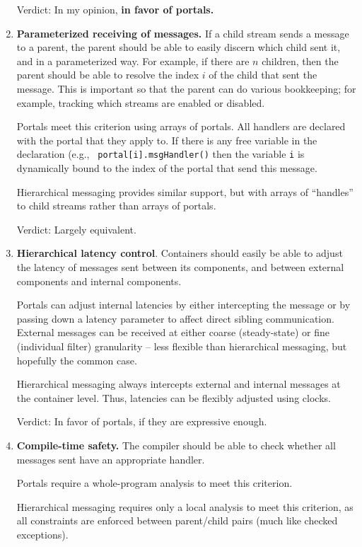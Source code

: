 \begin{enumerate}
Verdict: In my opinion, {\bf in favor of portals.}

\item {\bf Parameterized receiving of messages.}  If a child stream
sends a message to a parent, the parent should be able to easily
discern which child sent it, and in a parameterized way.  For example,
if there are $n$ children, then the parent should be able to resolve
the index $i$ of the child that sent the message.  This is important
so that the parent can do various bookkeeping; for example, tracking
which streams are enabled or disabled.

Portals meet this criterion using arrays of portals.  All
handlers are declared with the portal that they apply to.  If there is
any free variable in the declaration (e.g., {\tt
portal[i].msgHandler()} then the variable {\tt i} is dynamically bound
to the index of the portal that send this message.

Hierarchical messaging provides similar support, but with arrays
of ``handles'' to child streams rather than arrays of portals.

Verdict: Largely equivalent.

\item {\bf Hierarchical latency control}.  Containers should easily be
able to adjust the latency of messages sent between its components,
and between external components and internal components.

Portals can adjust internal latencies by either intercepting the
message or by passing down a latency parameter to affect direct
sibling communication.  External messages can be received at either
coarse (steady-state) or fine (individual filter) granularity -- less
flexible than hierarchical messaging, but hopefully the common case.

Hierarchical messaging always intercepts external and internal
messages at the container level.  Thus, latencies can be flexibly
adjusted using clocks.

Verdict: In favor of portals, if they are expressive enough.

\item {\bf Compile-time safety.}  The compiler should be able to check
whether all messages sent have an appropriate handler.

Portals require a whole-program analysis to meet this criterion.

Hierarchical messaging requires only a local analysis to meet
this criterion, as all constraints are enforced between parent/child
pairs (much like checked exceptions).


\end{enumerate}
